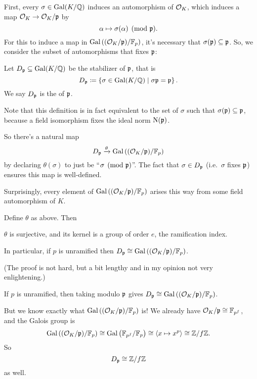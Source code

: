 First, every $\sigma \in \operatorname{Gal}(K/\mathbb Q)$ induces an automorphism of $\mathcal O_K$, which induces a map
$\mathcal O_K \to \mathcal O_K/\mathfrak p$ by
\[ \alpha \mapsto \sigma(\alpha) \pmod{\mathfrak p}. \]
For this to induce a map in $\operatorname{Gal}\left( (\mathcal O_K/\mathfrak p) / \mathbb F_p \right)$, it's necessary that $\sigma(\mathfrak p) \subseteq \mathfrak p$. So, we consider the subset of automorphisms that fixes $\mathfrak p$:
\begin{definition}
	Let $D_\mathfrak p \subseteq \operatorname{Gal}(K/\mathbb Q)$ be the stabilizer of $\mathfrak p$, that is
	\[ D_\mathfrak p \coloneqq \left\{ \sigma \in \operatorname{Gal}(K/\mathbb Q) \mid \sigma\mathfrak p = \mathfrak p \right\}. \]
	We say $D_\mathfrak p$ is the  of $\mathfrak p$.
\end{definition}
Note that this definition is in fact equivalent to the set of $\sigma$ such that $\sigma(\mathfrak p) \subseteq \mathfrak p$,
because a field isomorphism fixes the ideal norm $\operatorname{N}(\mathfrak p)$.

So there's a natural map
\[ D_\mathfrak p \xrightarrow{\theta} \operatorname{Gal}\left( (\mathcal O_K/\mathfrak p) / \mathbb F_p \right) \]
by declaring $\theta(\sigma)$ to just be ``$\sigma \pmod {\mathfrak p}$''.
The fact that $\sigma \in D_\mathfrak p$ (i.e.\ $\sigma$ fixes $\mathfrak p$)
ensures this map is well-defined.

Surprisingly, every element of $\operatorname{Gal}\left( (\mathcal O_K/\mathfrak p) / \mathbb F_p \right)$ arises this way from some field automorphism of $K$.

\begin{theorem}
	\label{thm:decomposition}
	Define $\theta$ as above. Then
	\begin{itemize}
		\ii $\theta$ is surjective, and
		\ii its kernel is a group of order $e$,
		the ramification index.
	\end{itemize}
	In particular, if $p$ is unramified then
	$D_\mathfrak p \cong \operatorname{Gal}\left( (\mathcal O_K/\mathfrak p)/\mathbb F_p \right)$.
\end{theorem}
(The proof is not hard, but a bit lengthy and in my opinion
not very enlightening.)

\begin{moral}
	If $p$ is unramified, then taking
	modulo $\mathfrak p$ gives
	$D_\mathfrak p \cong \operatorname{Gal}\left( (\mathcal O_K/\mathfrak p) / \mathbb F_p \right)$.
\end{moral}

But we know exactly what $\operatorname{Gal}\left( (\mathcal O_K/\mathfrak p)/\mathbb F_p \right)$ is!
We already have $ \mathcal O_K / \mathfrak p \cong \mathbb F_{p^f} $, and the Galois group is
\[
	\operatorname{Gal}\left( (\mathcal O_K/\mathfrak p) / \mathbb F_p \right)
	\cong \operatorname{Gal}\left( \mathbb F_{p^f} / \mathbb F_p \right)
	\cong \left< x \mapsto x^p \right>
	\cong \mathbb Z/f\mathbb Z.
\]
So \[ D_\mathfrak p \cong \mathbb Z/f\mathbb Z \] as well.

